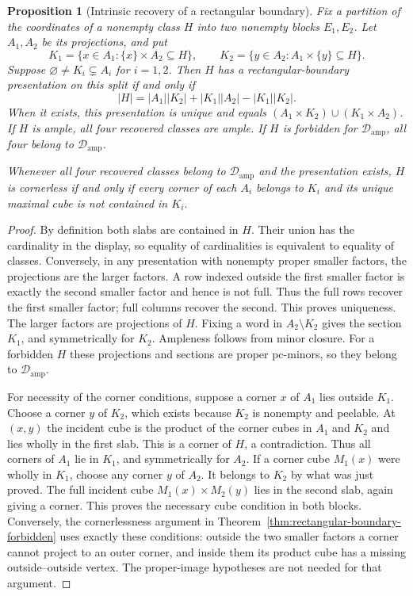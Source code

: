 \documentclass[11pt]{article}
\numberwithin{equation}{section}
\newtheorem{proposition}[theorem]{Proposition}
\theoremstyle{definition}
\theoremstyle{remark}
\newcommand{\Damp}{\mathcal D_{\mathrm{amp}}}
\begin{document}
\begin{proposition}[Intrinsic recovery of a rectangular boundary]
\label{prop:rectangular-boundary-recovery}
Fix a partition of the coordinates of a nonempty class $H$ into two
nonempty blocks $E_1,E_2$. Let $A_1,A_2$ be its projections, and put
\[
 K_1=\{x\in A_1:\{x\}\times A_2\subseteq H\},\qquad
 K_2=\{y\in A_2:A_1\times\{y\}\subseteq H\}.
\]
Suppose $\varnothing\ne K_i\subsetneq A_i$ for $i=1,2$.
Then $H$ has a rectangular-boundary presentation on this split if
and only if
\[
 |H|=|A_1||K_2|+|K_1||A_2|-|K_1||K_2|.
\]
When it exists, this presentation is unique and equals
$(A_1\times K_2)\cup(K_1\times A_2)$.
If $H$ is ample, all four recovered classes are ample. If $H$ is
forbidden for $\Damp$, all four belong to $\Damp$.

Whenever all four recovered classes belong to $\Damp$ and the
presentation exists, $H$ is cornerless if and only if every corner
of each $A_i$ belongs to $K_i$ and its unique maximal cube is not
contained in $K_i$.
\end{proposition}
\begin{proof}
By definition both slabs are contained in $H$. Their union has the
cardinality in the display, so equality of cardinalities is equivalent
to equality of classes. Conversely, in any presentation with nonempty
proper smaller factors, the projections are the larger factors. A
row indexed outside the first smaller factor is exactly the second
smaller factor and hence is not full. Thus the full rows recover the
first smaller factor; full columns recover the second. This proves
uniqueness. The larger factors are projections of $H$. Fixing a word
in $A_2\setminus K_2$ gives the section $K_1$, and symmetrically for
$K_2$. Ampleness follows from minor closure. For a forbidden $H$
these projections and sections are proper pc-minors, so they belong
to $\Damp$.

For necessity of the corner conditions, suppose a corner $x$ of
$A_1$ lies outside $K_1$. Choose a corner $y$ of $K_2$, which exists
because $K_2$ is nonempty and peelable. At $(x,y)$ the incident cube
is the product of the corner cubes in $A_1$ and $K_2$ and lies wholly
in the first slab. This is a corner of $H$, a contradiction. Thus
all corners of $A_1$ lie in $K_1$, and symmetrically for $A_2$.
If a corner cube $M_1(x)$ were wholly in $K_1$, choose any corner
$y$ of $A_2$. It belongs to $K_2$ by what was just proved.
The full incident cube $M_1(x)\times M_2(y)$ lies in the second
slab, again giving a corner. This proves the necessary cube condition
in both blocks. Conversely, the cornerlessness argument in
Theorem~\ref{thm:rectangular-boundary-forbidden} uses exactly these
conditions: outside the two smaller factors a corner cannot project
to an outer corner, and inside them its product cube has a missing
outside--outside vertex. The proper-image hypotheses are not needed
for that argument.
\end{proof}
\end{document}
